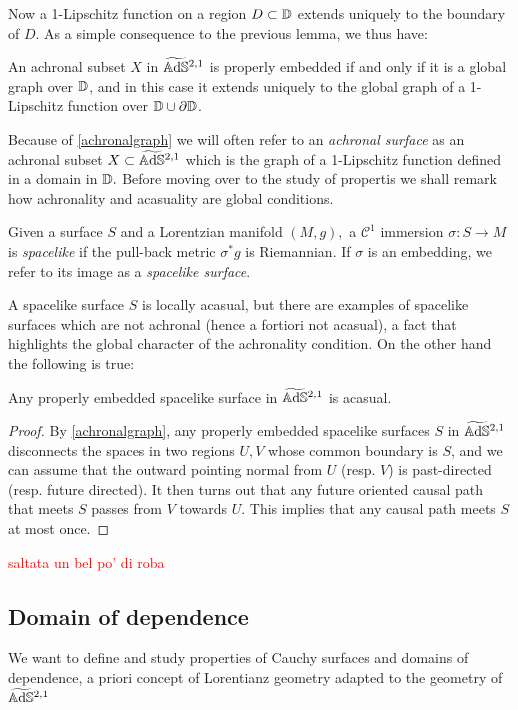 Now a 1-Lipschitz function on a region $D\subset \mathbb{D}$ extends uniquely to the boundary of $D$. As a simple consequence to the previous lemma, we thus have: 

\begin{lemma}\label{achronalgraph}
    An achronal subset $X$ in $\widetilde{\mathbb{A}\mathrm{d}\mathbb{S}}{}^{2,1}$ is properly embedded if and only if it is a global graph over $\mathbb{D}$, and in this case it extends uniquely to the global graph of a 1-Lipschitz function over $\mathbb{D}\cup\partial\mathbb{D}$.
\end{lemma}

Because of \ref{achronalgraph} we will often refer to an \textit{achronal surface} as an achronal subset $X\subset\widetilde{\mathbb{A}\mathrm{d}\mathbb{S}}{}^{2,1}$ which is the graph of a 1-Lipschitz function defined in a domain in $\mathbb{D}.$ Before moving over to the study of propertis we shall remark how achronality and acasuality are global conditions.

\begin{definition} Given a surface $S$ and a Lorentzian manifold $(M,g),$ a $\mathcal{C}^1$ immersion $\sigma:S\to M$ is \textit{spacelike} if the pull-back metric $\sigma^*g$ is Riemannian. If $\sigma$ is an embedding, we refer to its image as a \textit{spacelike surface}.
\end{definition}

A spacelike surface $S$ is locally acasual, but there are examples of spacelike surfaces which are not achronal (hence a fortiori not acasual), a fact that highlights the global character of the achronality condition. On the other hand the following is true: 

\begin{lemma}
    Any properly embedded spacelike surface in $\widetilde{\mathbb{A}\mathrm{d}\mathbb{S}}{}^{2,1}$ is acasual. 
\end{lemma}
\begin{proof}
    By \ref{achronalgraph}, any properly embedded spacelike surfaces $S$ in $\widetilde{\mathbb{A}\mathrm{d}\mathbb{S}}{}^{2,1}$ disconnects the spaces in two regions $U,V$ whose common boundary is $S$, and we can assume that the outward pointing normal from $U$ (resp. $V$) is past-directed (resp. future directed). It then turns out that any future oriented causal path that meets $S$ passes from $V$ towards $U$. This implies that any causal path meets $S$ at most once. 
\end{proof}

\textcolor{red}{saltata un bel po' di roba}

\subsection{Domain of dependence}
We want to define and study properties of Cauchy surfaces and domains of dependence, a priori concept of Lorentianz geometry adapted to the geometry of $\widetilde{\mathbb{A}\mathrm{d}\mathbb{S}}{}^{2,1}$

